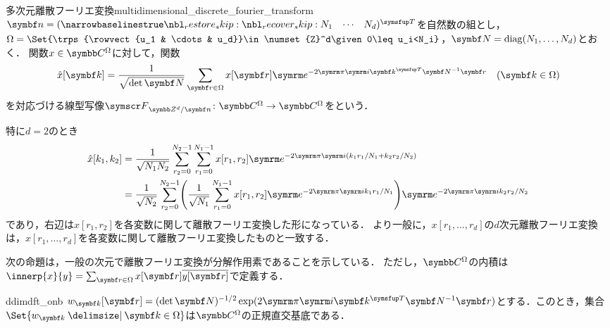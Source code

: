 \documentclass[../../main]{subfiles}
\begin{document}
\begin{definition}{多次元離散フーリエ変換}{multidimensional_discrete_fourier_transform}
  \(\vect{n}=\trps{\rowvect{N_1 & \cdots & N_d}}\)を自然数の組とし，\(\Omega=\Set{\trps{\rowvect{u_1 & \cdots & u_d}}\in\numset{Z}^d\given 0\leq u_i<N_i}\)，\(\mat{N}=\diag(N_1,\dots,N_d)\)とおく．
  関数\(x\in\mapset{\Omega}{\numset{C}}\)に対して，関数
  \[
    \hat{x}[\vect{k}] = \frac{1}{\sqrt{\det\mat{N}}}\sum_{\vect{r}\in\Omega}x[\vect{r}]\napr^{-2\krez\iuni\trps{\vect{k}}\mat{N}^{-1}\vect{r}}\quad(\vect{k}\in\Omega)
  \]
  を対応づける線型写像\(\dft[d]{\vect{n}}\colon\mapset{\Omega}{\numset{C}}\to\mapset{\Omega}{\numset{C}}\)をという．
\end{definition}

特に\(d=2\)のとき
\begin{align*}
  \hat{x}[k_1,k_2] &= \frac{1}{\sqrt{N_1N_2}}\sum_{r_2=0}^{N_2-1}\sum_{r_1=0}^{N_1-1}x[r_1,r_2]\napr^{-2\krez\iuni(k_1r_1/N_1+k_2r_2/N_2)} \\
  &= \frac{1}{\sqrt{N_2}}\sum_{r_2=0}^{N_2-1}\pqty*{\frac{1}{\sqrt{N_1}}\sum_{r_1=0}^{N_1-1}x[r_1,r_2]\napr^{-2\krez\iuni k_1r_1/N_1}}\napr^{-2\krez\iuni k_2r_2/N_2}
\end{align*}
であり，右辺は\(x[r_1,r_2]\)を各変数に関して離散フーリエ変換した形になっている．
より一般に，\(x[r_1,\dots,r_d]\)の\(d\)次元離散フーリエ変換は，\(x[r_1,\dots,r_d]\)を各変数に関して離散フーリエ変換したものと一致する．

次の命題は，一般の次元で離散フーリエ変換が分解作用素であることを示している．
ただし，\(\mapset{\Omega}{\numset{C}}\)の内積は\(\innerp{x}{y}=\sum_{\vect{r}\in\Omega}x[\vect{r}]\conj*{y[\vect{r}]}\)で定義する．

\begin{proposition}{}{ddimdft_onb}
  \(w_{\vect{k}}[\vect{r}]=(\det\mat{N})^{-1/2}\exp(2\krez\iuni\trps{\vect{k}}\mat{N}^{-1}\vect{r})\)とする．このとき，集合\(\Set{w_{\vect{k}}\given\vect{k}\in\Omega}\)は\(\mapset{\Omega}{\numset{C}}\)の正規直交基底である．
\end{proposition}
\end{document}
